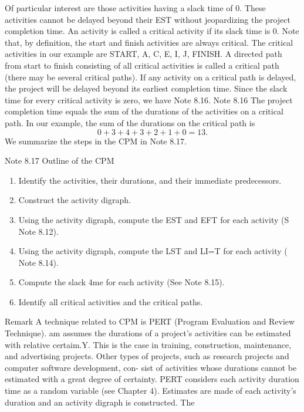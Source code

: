 \documentclass{article}
\begin{document}
Of particular interest are those activities having a slack time of 0. These activities 
cannot be delayed beyond their EST without jeopardizing the project completion time. 
An activity is called a critical activity if its slack time is 0. Note that, by definition, the 
start and finish activities are always critical. The critical activities in our example are 
START, A, C, E, I, J, FINISH. A directed path from start to finish consisting of all critical 
activities is called a critical path (there may be several critical paths). If any activity on 
a critical path is delayed, the project will be delayed beyond its earliest completion 
time. 
Since the slack time for every critical activity is zero, we have Note 8.16. 
Note 8.16 
The project completion time equals the sum of the durations of the activities 
on a critical path. 
In our example, the sum of the durations on the critical path is 
\[ 0 + 3 + 4 + 3 + 2 + 1 + 0 = 13. \]
We summarize the steps in the CPM in Note 8.17. 
\begin{framed}
Note 8.17 Outline of the CPM 
\begin{enumerate}
    \item  Identify the activities, their durations, and their immediate predecessors. 
\item Construct the activity digraph. 
\item Using the activity digraph, compute the EST and EFT for each activity (S 
Note 8.12). 
\item  Using the activity digraph, compute the LST and LI=T for each activity ( 
Note 8.14). 
\item Compute the slack 4me for each activity (See Note 8.15). 
\item Identify all critical activities and the critical paths.
\end{enumerate}
 
\end{framed}
Remark A technique related to CPM is PERT (Program Evaluation and Review Technique). am 
assumes the durations of a project's activities can be estimated with relative certaim.Y. 
This is the case in training, construction, maintenance, and advertising projects. Other 
types of projects, such as research projects and computer software development, con-
sist of activities whose durations cannot be estimated with a great degree of certainty. 
PERT considers each activity duration time as a random variable (see Chapter 4). Estimates are made of each activity's duration and an activity digraph is constructed. The 
\end{document}
